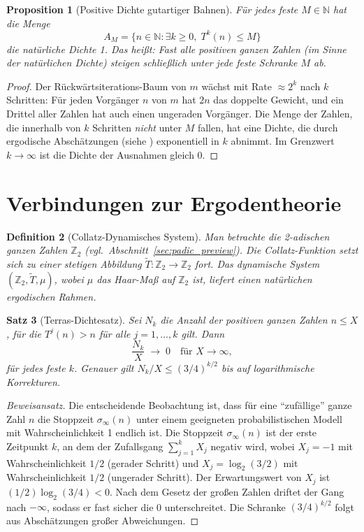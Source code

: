 \documentclass[12pt,a4paper]{article}
\newtheorem{theorem}{Satz}[section]
\newtheorem{proposition}[theorem]{Proposition}
\newtheorem{definition}[theorem]{Definition}
\begin{document}
\begin{proposition}[Positive Dichte gutartiger Bahnen]\label{prop:pos_density}
Für jedes feste $M \in \mathbb{N}$ hat die Menge
\[
  A_M = \{n \in \mathbb{N} : \exists k \geq 0,\; T^k(n) \leq M\}
\]
die natürliche Dichte 1. Das heißt: Fast alle positiven ganzen Zahlen (im Sinne der
natürlichen Dichte) steigen schließlich unter jede feste Schranke $M$ ab.
\end{proposition}

\begin{proof}
Der Rückwärtsiterations-Baum von $m$ wächst mit Rate $\approx 2^k$ nach $k$ Schritten:
Für jeden Vorgänger $n$ von $m$ hat $2n$ das doppelte Gewicht, und ein Drittel aller
Zahlen hat auch einen ungeraden Vorgänger. Die Menge der Zahlen, die innerhalb von $k$
Schritten \emph{nicht} unter $M$ fallen, hat eine Dichte, die durch ergodische
Abschätzungen (siehe \cite{Terras1976}) exponentiell in $k$ abnimmt. Im Grenzwert
$k \to \infty$ ist die Dichte der Ausnahmen gleich 0.
\end{proof}

\section{Verbindungen zur Ergodentheorie}

\begin{definition}[Collatz-Dynamisches System]\label{def:shift}
Man betrachte die 2-adischen ganzen Zahlen $\mathbb{Z}_2$ (vgl.\ Abschnitt~\ref{sec:padic_preview}).
Die Collatz-Funktion setzt sich zu einer stetigen Abbildung
$\tilde{T}\colon \mathbb{Z}_2 \to \mathbb{Z}_2$
fort. Das dynamische System $(\mathbb{Z}_2, \tilde{T}, \mu)$, wobei $\mu$ das
Haar-Maß auf $\mathbb{Z}_2$ ist, liefert einen natürlichen ergodischen Rahmen.
\end{definition}

\begin{theorem}[Terras-Dichtesatz]\label{thm:terras}
Sei $N_k$ die Anzahl der positiven ganzen Zahlen $n \leq X$, für die $T^j(n) > n$ für
alle $j = 1, \ldots, k$ gilt. Dann
\[
  \frac{N_k}{X} \;\longrightarrow\; 0 \quad \text{für } X \to \infty,
\]
für jedes feste $k$. Genauer gilt $N_k/X \leq (3/4)^{k/2}$ bis auf logarithmische
Korrekturen.
\end{theorem}

\begin{proof}[Beweisansatz]
Die entscheidende Beobachtung ist, dass für eine ``zufällige'' ganze Zahl $n$ die
Stoppzeit $\sigma_\infty(n)$ unter einem geeigneten probabilistischen Modell mit
Wahrscheinlichkeit 1 endlich ist. Die Stoppzeit $\sigma_\infty(n)$ ist der erste
Zeitpunkt $k$, an dem der Zufallsgang $\sum_{j=1}^k X_j$ negativ wird, wobei
$X_j = -1$ mit Wahrscheinlichkeit $1/2$ (gerader Schritt) und
$X_j = \log_2(3/2)$ mit Wahrscheinlichkeit $1/2$ (ungerader Schritt).
Der Erwartungswert von $X_j$ ist $(1/2)\log_2(3/4) < 0$. Nach dem Gesetz der
großen Zahlen driftet der Gang nach $-\infty$, sodass er fast sicher die 0 unterschreitet.
Die Schranke $(3/4)^{k/2}$ folgt aus Abschätzungen großer Abweichungen.
\end{proof}
\end{document}
